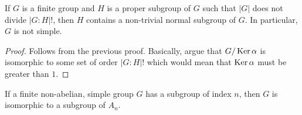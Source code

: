 \begin{corollary}
	If $G$ is a finite group and $H$ is a proper subgroup of $G$ such that $|G|$ does not divide $|G:H|!$, then $H$ contains a non-trivial normal subgroup of $G$. In particular, $G$ is not simple.
\end{corollary}
\begin{proof}
	Follows from the previous proof. Basically, argue that $G/\operatorname{Ker}\alpha$ is isomorphic to some set of order $|G:H|!$ which would mean that $\operatorname{Ker}\alpha$ must be greater than $1$.
\end{proof}

\begin{corollary}
	If a finite non-abelian, simple group $G$ has a subgroup of index $n$, then $G$ is isomorphic to a subgroup of $A_n$.
\end{corollary}